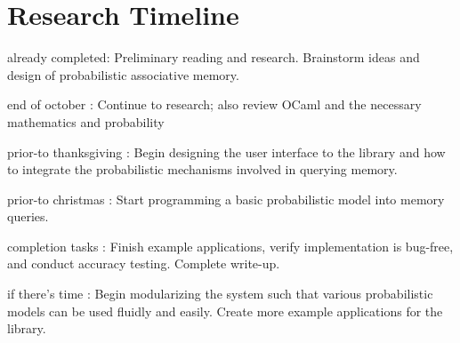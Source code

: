 \documentclass{sig-alternate}
\begin{document}


\section{Research Timeline}
\label{sec:research_timeline}

\begin{itemize*}
	\item {\sc already completed}: Preliminary reading and research. Brainstorm ideas and design of probabilistic associative memory. \vspace{3pt}
	\item {\sc end of october} : Continue to research; also review OCaml and the necessary mathematics and probability\vspace{3pt}
	\item {\sc prior-to thanksgiving} : Begin designing the user interface to the library and how to integrate the probabilistic mechanisms involved in querying memory.\vspace{3pt}
	\item {\sc prior-to christmas} : Start programming a basic probabilistic model into memory queries.\vspace{3pt}
	\item {\sc completion tasks} : Finish example applications, verify implementation is bug-free, and conduct accuracy testing. Complete write-up.\vspace{3pt}
	\item {\sc if there's time} : Begin modularizing the system such that various probabilistic models can be used fluidly and easily. Create more example applications for the library.
\end{itemize*}
\end{document}
